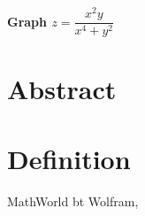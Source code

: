 \documentclass[12pt,dvipdfmx]{article}
\begin{document}
\begin{center}

{\bf \Large Graph $z=\dfrac{x^2y}{x^4+y^2}$}

\end{center}


\section{Abstract}


\section{Definition}



\begin{thebibliography}{9}

 MathWorld bt Wolfram, \verb||


\end{thebibliography}
\end{document}
